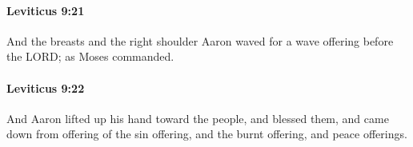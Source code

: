 		\paragraph{Leviticus 9:21} %
			\label{LEVITICUS-9-21}

			And the breasts and the right shoulder Aaron waved for a wave offering before the LORD; as Moses commanded.


		\paragraph{Leviticus 9:22} %
			\label{LEVITICUS-9-22}

			And Aaron lifted up his hand toward the people, and blessed them, and came down from offering of the sin offering, and the burnt offering, and peace offerings.


